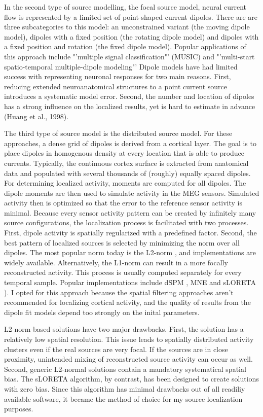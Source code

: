 In the second type of source modelling, the focal source model, neural current flow is represented by a limited set of point-shaped current dipoles.
There are are three subcategories to this model: an unconstrained variant (the moving dipole model), dipoles with a fixed position (the rotating dipole model) and dipoles with a fixed position and rotation (the fixed dipole model).
Popular applications of this approach include "'multiple signal classification"' (MUSIC) \cite{1.5.music} and "'multi-start spatio-temporal multiple-dipole modeling"' \cite{1.5.simplex}
Dipole models have had limited success with representing neuronal responses for two main reasons.
First, reducing extended neuroanatomical structures to a point current source introduces a systematic model error.
Second, the number and location of dipoles has a strong influence on the localized results, yet is hard to estimate in advance (Huang et al., 1998).

The third type of source model is the distributed source model.
For these approaches, a dense grid of dipoles is derived from a cortical layer.
The goal is to place dipoles in homogenous density at every location that is able to produce currents.
Typically, the continuous cortex surface is extracted from anatomical data and populated with several thousands of (roughly) equally spaced dipoles.
For determining localized activity, moments are computed for all dipoles.
The dipole moments are then used to simulate activity in the MEG sensors.
Simulated activity then is optimized so that the error to the reference sensor activity is minimal.
Because every sensor activity pattern can be created by infinitely many source configurations, the localization process is facilitated with two processes.
First, dipole activity is spatially regularized with a predefined factor.
Second, the best pattern of localized sources is selected by minimizing the norm over all dipoles.
The most popular norm today is the L2-norm \cite{1.5.L2}, and implementations are widely available.
Alternatively, the L1-norm \cite{1.5.L1} can result in a more focally reconstructed activity.
This process is usually computed separately for every temporal sample.
Popular implementations include dSPM \cite{1.5.dSPM}, MNE \cite{1.5.MNE} and sLORETA \cite{1.5.sLORETA}).
I opted for this approach because the spatial filtering approaches aren't recommended for localizing cortical activity, and the quality of results from the dipole fit models depend too strongly on the inital parameters.

L2-norm-based solutions have two major drawbacks.
First, the solution has a relatively low spatial resolution.
This issue leads to spatially distributed activity clusters even if the real sources are very focal.
If the sources are in close proximity, unintended mixing of reconstructed source activity can occur as well.
Second, generic L2-normal solutions contain a mandatory systematical spatial bias.
The sLORETA algorithm, by contrast, has been designed to create solutions with zero bias.
Since this algorithm has minimal drawbacks out of all readiliy available software, it became the method of choice for my source localization purposes.

